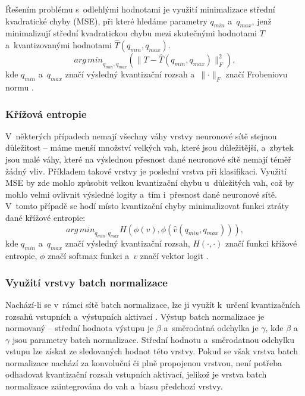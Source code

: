 Řešením problému s~odlehlými hodnotami je využití minimalizace střední kvadratické chyby (MSE), při které hledáme parametry $q_{min}$ a~$q_{max}$, jenž minimalizují střední kvadratickou chybu mezi skutečnými hodnotami $T$ a~kvantizovanými hodnotami $\widehat{T}(q_{min}, q_{max})$.
\begin{equation}
    {arg\,min}_{q_{min}, q_{max}} (\lVert T - \widehat{T}(q_{min}, q_{max}) \rVert_F^2),
\end{equation}
kde $q_{min}$ a~$q_{max}$ značí výsledný kvantizační rozsah a~$\lVert \cdot \rVert_F$ značí Frobeniovu normu \cite{nagel2021white}.

\subsubsection{Křížová entropie}
V~některých případech nemají všechny váhy vrstvy neuronové sítě stejnou důležitost -- máme menší množství velkých vah, které jsou důležitější, a~zbytek jsou malé váhy, které na výslednou přesnost dané neuronové sítě nemají téměř žádný vliv. Příkladem takové vrstvy je poslední vrstva při klasifikaci. Využití MSE by zde mohlo způsobit velkou kvantizační chybu u~důležitých vah, což by mohlo velmi ovlivnit výsledné logity a~tím i~přesnost dané neuronové sítě. V~tomto případě se hodí místo kvantizační chyby minimalizovat funkci ztráty dané křížové entropie:
\begin{equation}
    {arg\,min}_{q_{min}, q_{max}} H(\phi(v),\phi(\widehat{v}(q_{min}, q_{max}))),
\end{equation}
kde $q_{min}$ a~$q_{max}$ značí výsledný kvantizační rozsah, $H(\cdot,\cdot)$ značí funkci křížové entropie, $\phi$ značí softmax funkci a~$v$ značí vektor logit \cite{nagel2021white}.

\subsubsection{Využití vrstvy batch normalizace}
Nachází-li se v~rámci sítě batch normalizace, lze ji využít k~určení kvantizačních rozsahů vstupních a~výstupních aktivací \cite{nagel2021white}. Výstup batch normalizace je normovaný -- střední hodnota výstupu je $\beta$ a~směrodatná odchylka je $\gamma$, kde $\beta$ a~$\gamma$ jsou parametry batch normalizace. Střední hodnotu a~směrodatnou odchylku vstupu lze získat ze sledovaných hodnot této vrstvy. Pokud se však vrstva batch normalizace nachází za konvoluční či plně propojenou vrstvou, není potřeba odhadovat kvantizační rozsah vstupních aktivací, jelikož je vrstva batch normalizace zaintegrována do vah a~biasu předchozí vrstvy.

